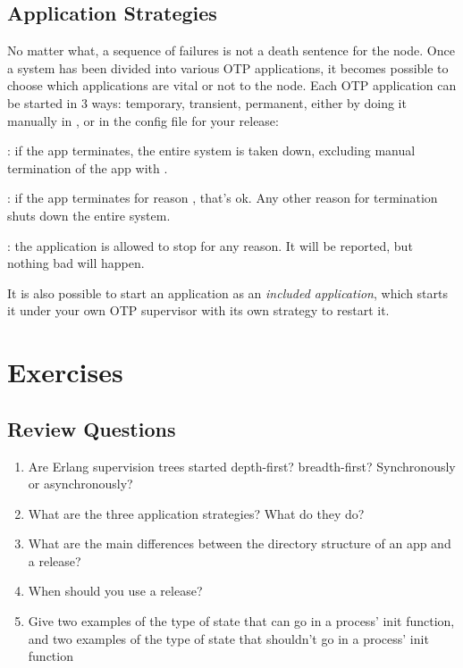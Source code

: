 \subsection{Application Strategies}
\label{subsec:start-link-application-strategies}

No matter what, a sequence of failures is not a death sentence for the node. Once a system has been divided into various OTP applications, it becomes possible to choose which applications are vital or not to the node. Each OTP application can be started in 3 ways: temporary, transient, permanent, either by doing it manually in , or in the config file for your release:

\begin{itemize*}
	\item {}: if the app terminates, the entire system is taken down, excluding manual termination of the app with .
	\item {}: if the app terminates for reason , that's ok. Any other reason for termination shuts down the entire system.
	\item {}: the application is allowed to stop for any reason. It will be reported, but nothing bad will happen.
\end{itemize*}

It is also possible to start an application as an \emph{included application}, which starts it under your own OTP supervisor with its own strategy to restart it.

\section{Exercises}

\subsection*{Review Questions}

\begin{enumerate}
	\item  Are Erlang supervision trees started depth-first? breadth-first? Synchronously or asynchronously?
	\item What are the three application strategies? What do they do?
	\item What are the main differences between the directory structure of an app and a release?
	\item When should you use a release?
	\item Give two examples of the type of state that can go in a process' init function, and two examples of the type of state that shouldn't go in a process' init function
\end{enumerate}

